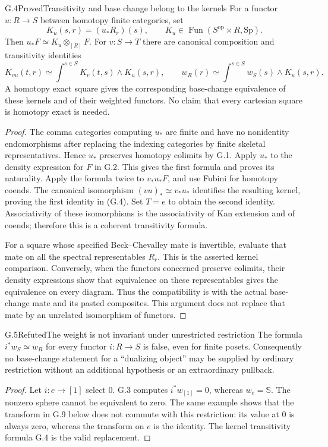 \begin{claim}{G.4}{Proved}{Transitivity and base change belong to the kernels}
For a functor $u:R\to S$ between homotopy finite categories, set
\[
 K_u(s,r)=(u_*R_r)(s),\qquad
 K_u\in\operatorname{Fun}(S^{\mathrm{op}}\times R,\mathrm{Sp}).
\]
Then $u_*F\simeq K_u\otimes_{[R]}F$. For $v:S\to T$ there are
canonical composition and transitivity identities
\[
 K_{vu}(t,r)\simeq\int^{s\in S}K_v(t,s)\wedge K_u(s,r),\qquad
 w_R(r)\simeq\int^{s\in S}w_S(s)\wedge K_u(s,r).
\tag{G.4}
\]
A homotopy exact square gives the corresponding base-change
equivalence of these kernels and of their weighted functors. No
claim that every cartesian square is homotopy exact is needed.
\end{claim}
\begin{proof}
The comma categories computing $u_*$ are finite and have no
nonidentity endomorphisms after replacing the indexing categories
by finite skeletal representatives. Hence $u_*$ preserves homotopy
colimits by G.1. Apply $u_*$ to the density expression for $F$ in
G.2. This gives the first formula and proves its naturality.
Apply the formula twice to $v_*u_*F$, and use Fubini for homotopy
coends. The canonical isomorphism $(vu)_*\simeq v_*u_*$ identifies
the resulting kernel, proving the first identity in (G.4).
Set $T=e$ to obtain the second identity. Associativity of these
isomorphisms is the associativity of Kan extension and of coends;
therefore this is a coherent transitivity formula.

For a square whose specified Beck--Chevalley mate is invertible,
evaluate that mate on all the spectral representables $R_r$.
This is the asserted kernel comparison. Conversely, when the
functors concerned preserve colimits, their density expressions
show that equivalence on these representables gives the equivalence
on every diagram. Thus the compatibility is with the actual
base-change mate and its pasted composites. This argument does not
replace that mate by an unrelated isomorphism of functors.
\end{proof}

\begin{claim}{G.5}{Refuted}{The weight is not invariant under unrestricted restriction}
The formula $i^*w_S\simeq w_R$ for every functor $i:R\to S$ is
false, even for finite posets. Consequently no base-change statement
for a ``dualizing object'' may be supplied by ordinary restriction
without an additional hypothesis or an extraordinary pullback.
\end{claim}
\begin{proof}
Let $i:e\to[1]$ select $0$. G.3 computes
$i^*w_{[1]}=0$, whereas $w_e=\mathbb S$. The nonzero sphere cannot
be equivalent to zero. The same example shows that the transform
in G.9 below does not commute with this restriction: its value at
$0$ is always zero, whereas the transform on $e$ is the identity.
The kernel transitivity formula G.4 is the valid replacement.
\end{proof}

